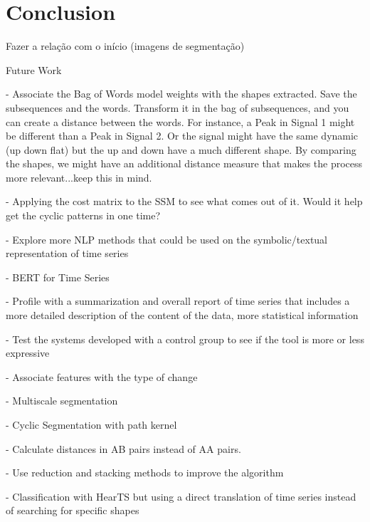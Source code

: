 
%

\chapter{Conclusion}
\label{cha:Conclusion}


Fazer a relação com o início (imagens de segmentação)

Future Work

- Associate the Bag of Words model weights with the shapes extracted. Save the subsequences and the words. Transform it in the bag of subsequences, and you can create a distance between the words. For instance, a Peak in Signal 1 might be different than a Peak in Signal 2. Or the signal might have the same dynamic (up down flat) but the up and down have a much different shape. By comparing the shapes, we might have an additional distance measure that makes the process more relevant...keep this in mind.

- Applying the cost matrix to the SSM to see what comes out of it. Would it help get the cyclic patterns in one time?

- Explore more NLP methods that could be used on the symbolic/textual representation of time series

- BERT for Time Series

- Profile with a summarization and overall report of time series that includes a more detailed description of the content of the data, more statistical information

- Test the systems developed with a control group to see if the tool is more or less expressive

- Associate features with the type of change

- Multiscale segmentation

- Cyclic Segmentation with path kernel

- Calculate distances in AB pairs instead of AA pairs.

- Use reduction and stacking methods to improve the algorithm

- Classification with HearTS but using a direct translation of time series instead of searching for specific shapes

